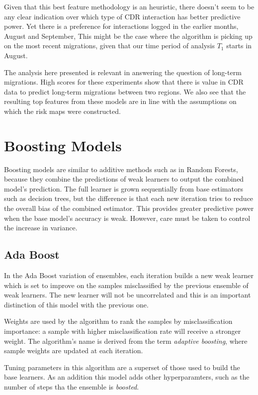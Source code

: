 Given that this best feature methodology is an heuristic, there doesn't seem to be any clear indication over which type of CDR interaction has better predictive power.
Yet there is a preference for interactions logged in the earlier months, August and September,
This might be the case where the algorithm is picking up on the most recent migrations, given that our time period of analysis $T_1$ starts in August.

The analysis here presented is relevant in answering the question of long-term migrations.
High scores for these experiments show that there is value in CDR data to predict long-term migrations between two regions.
We also see that the resulting top features from these models are in line with the assumptions on which the risk maps were constructed.


\section{Boosting Models}\label{section:gradient_boosting}

Boosting models are similar to additive methods such as in Random Forests, because they combine the predictions of weak learners to output the combined model's prediction.
The full learner is grown sequentially from base estimators such as decision trees, but the difference is that each new iteration tries to reduce the overall bias of the combined estimator.
This provides greater predictive power when the base model's accuracy is weak.
However, care must be taken to control the increase in variance.

\subsection{Ada Boost}

In the Ada Boost variation of ensembles, each iteration builds a new weak learner which is set to improve on the samples misclassified by the previous ensemble of weak learners.
The new learner will not be uncorrelated and this is an important distinction of this model with the previous one.

Weights are used by the algorithm to rank the samples by misclassification importance: a sample with higher misclassification rate will receive a stronger weight.
The algorithm's name is derived from the term \textit{adaptive boosting}, where sample weights are updated at each iteration.

Tuning parameters in this algorithm are a superset of those used to build the base learners.
As an addition this model adds other hyperparamters, such as the number of steps tha the ensemble is \textit{boosted}.


